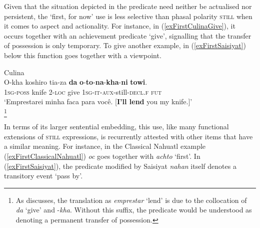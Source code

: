 Given that the situation depicted in the predicate need neither be actualised nor persistent, the \lq first, for now\rq{ }use is less selective than phasal polarity \textsc{still} when it comes to aspect and actionality. For instance, in (\ref{exFirstCulinaGive}), it occurs together with an achievement predicate \lq give\rq{}, signalling that the transfer of possession is only temporary. To give another example, in (\ref{exFirstSaisiyat}) below this function goes together with a  viewpoint.

\begin{exe}
	\ex Culina\label{exFirstCulinaGive}\\
	\gll O-kha koshiro tia-za \textbf{da} \textbf{o}-\textbf{to}-\textbf{na}-\textbf{kha}-\textbf{ni} \textbf{towi}.\\
	1\textsc{sg}-\textsc{poss} knife 2-\textsc{loc} give 1\textsc{sg}-\textsc{it}-\textsc{aux}-still-\textsc{decl}.\textsc{f} \textsc{fut}\\
	\glt \lq Emprestarei minha faca para você. [\textbf{I'll lend} you my knife.]\rq{}
	\\\parencite[185]{Tiss2004}\footnote{As \textcite[185]{Tiss2004} discusses, the translation as \textit{emprestar} \lq lend\rq{ }is due to the collocation of \textit{da} \lq give\rq{ }and \mbox{-\textit{kha}}. Without this suffix, the predicate would be understood as denoting a permanent transfer of possession.}
\end{exe}

In terms of its larger sentential embedding, this use, like many functional extensions of \textsc{still} expressions, is recurrently attested with other items that have a similar meaning. For instance, in the Classical Nahuatl example (\ref{exFirstClassicalNahuatl}) \textit{oc} goes together with \textit{achto} \lq first\rq{}. In (\ref{exFirstSaisiyat}), the predicate modified by Saisiyat \textit{nahan} itself denotes a transitory event \lq pass by\rq{}.

